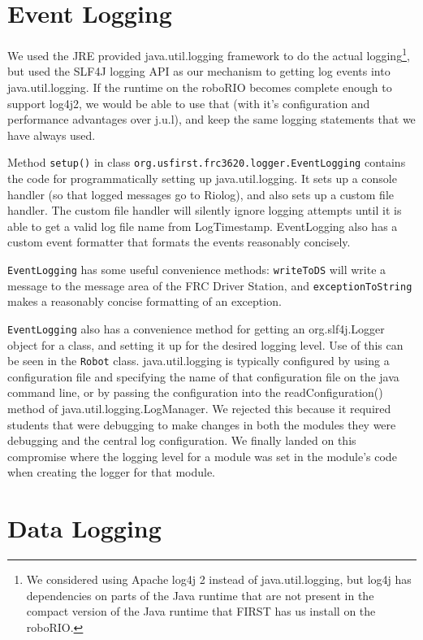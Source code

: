 \documentclass[]{article}
\begin{document}
\section {Event Logging}

We used the JRE provided java.util.logging framework to do the actual logging\footnote {
We considered using Apache log4j 2 instead of java.util.logging, but log4j has dependencies on parts of the Java runtime that are not present in the compact version of the Java runtime that FIRST has us install on the roboRIO.
}, but used the SLF4J logging API as our mechanism to getting log events into java.util.logging.
If the runtime on the roboRIO becomes complete enough to support log4j2, we would be able to use that (with it's configuration and performance advantages over j.u.l), and keep the same logging statements that we have always used.

Method \texttt{setup()} in class \texttt{org.usfirst.frc3620.logger.EventLogging} contains the code for programmatically setting up java.util.logging.
It sets up a console handler (so that logged messages go to Riolog), and also sets up a custom file handler.
The custom file handler will silently ignore logging attempts until it is able to get a valid log file name from LogTimestamp.
EventLogging also has a custom event formatter that formats the events reasonably concisely.

\texttt{EventLogging} has some useful convenience methods:
\texttt{writeToDS} will write a message to the message area of the FRC Driver Station, and \texttt{exceptionToString} makes a reasonably concise formatting of an exception.

\texttt{EventLogging} also has a convenience method for getting an org.slf4j.Logger object for a class, and setting it up for the desired logging level.
Use of this can be seen in the \texttt{Robot} class.
java.util.logging is typically configured by using a configuration file and specifying the name of that configuration file on the java command line, or by passing the configuration into the readConfiguration() method of java.util.logging.LogManager.
We rejected this because it required students that were debugging to make changes in both the modules they were debugging and the central log configuration.
We finally landed on this compromise where the logging level for a module was set in the module's code when creating the logger for that module.

\section {Data Logging}
\end{document}
